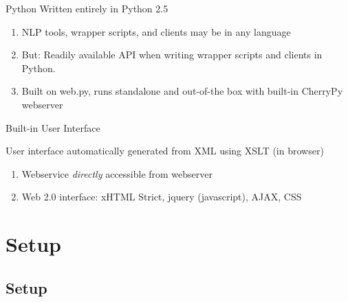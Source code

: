\documentclass[compress]{beamer}
\begin{document}
\begin{frame}
    \begin{block}{Python}
            Written entirely in Python 2.5

            \begin{enumerate}
                \item NLP tools, wrapper scripts, and clients may be in any language 
                \item But: Readily available API  when writing wrapper scripts and clients in Python.
                \item Built on web.py, runs standalone and out-of-the box with built-in CherryPy webserver        
            \end{enumerate}

    \end{block}
\end{frame}


\begin{frame}
    \begin{block}{Built-in User Interface}

            User interface automatically generated from XML using XSLT (in browser)

            \begin{enumerate}
                \item Webservice \emph{directly} accessible from webserver
                \item Web 2.0 interface: xHTML Strict, jquery (javascript), AJAX, CSS
            \end{enumerate}


    \end{block}
\end{frame}



\section{Setup}

\subsection{Setup}
\end{document}
